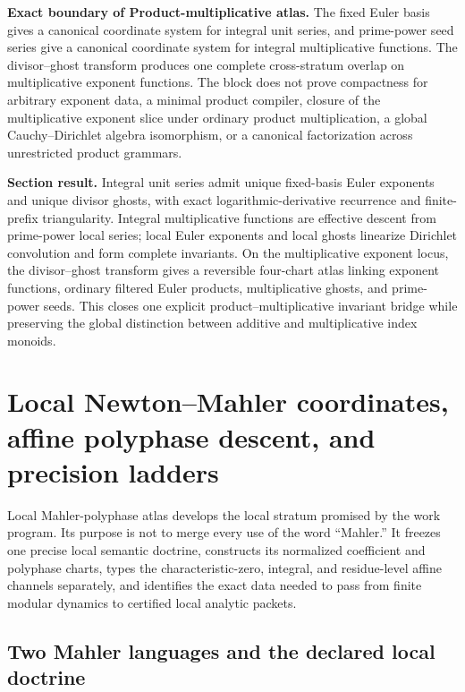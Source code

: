 \documentclass[11pt]{article}
\theoremstyle{definition}
\theoremstyle{remark}
\begin{document}
\begin{boundarybox}
\textbf{Exact boundary of Product-multiplicative atlas.}
The fixed Euler basis gives a canonical coordinate system for integral unit series, and prime-power seed series give a canonical coordinate system for integral multiplicative functions.  The divisor--ghost transform produces one complete cross-stratum overlap on multiplicative exponent functions.  The block does not prove compactness for arbitrary exponent data, a minimal product compiler, closure of the multiplicative exponent slice under ordinary product multiplication, a global Cauchy--Dirichlet algebra isomorphism, or a canonical factorization across unrestricted product grammars.
\end{boundarybox}

\begin{resultbox}
\textbf{Section result.}
Integral unit series admit unique fixed-basis Euler exponents and unique divisor ghosts, with exact logarithmic-derivative recurrence and finite-prefix triangularity.  Integral multiplicative functions are effective descent from prime-power local series; local Euler exponents and local ghosts linearize Dirichlet convolution and form complete invariants.  On the multiplicative exponent locus, the divisor--ghost transform gives a reversible four-chart atlas linking exponent functions, ordinary filtered Euler products, multiplicative ghosts, and prime-power seeds.  This closes one explicit product--multiplicative invariant bridge while preserving the global distinction between additive and multiplicative index monoids.
\end{resultbox}



\section{Local Newton--Mahler coordinates, affine polyphase descent, and precision ladders}
\label{sec:block08-local}

Local Mahler-polyphase atlas develops the local stratum promised by the work program.  Its purpose is not to merge every use of the word ``Mahler.''  It freezes one precise local semantic doctrine, constructs its normalized coefficient and polyphase charts, types the characteristic-zero, integral, and residue-level affine channels separately, and identifies the exact data needed to pass from finite modular dynamics to certified local analytic packets.

\subsection{Two Mahler languages and the declared local doctrine}
\label{subsec:block08-two-languages}
\end{document}
